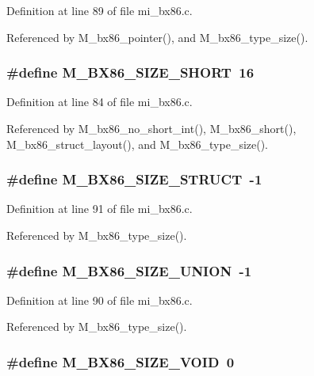 Definition at line 89 of file mi\_\-bx86.c.

Referenced by M\_\-bx86\_\-pointer(), and M\_\-bx86\_\-type\_\-size().
\subsubsection{\setlength{\rightskip}{0pt plus 5cm}\#define M\_\-BX86\_\-SIZE\_\-SHORT~16}\label{mi__bx86_8c_5a85d87ddb76ac09baf70c520844e799}




Definition at line 84 of file mi\_\-bx86.c.

Referenced by M\_\-bx86\_\-no\_\-short\_\-int(), M\_\-bx86\_\-short(), M\_\-bx86\_\-struct\_\-layout(), and M\_\-bx86\_\-type\_\-size().
\subsubsection{\setlength{\rightskip}{0pt plus 5cm}\#define M\_\-BX86\_\-SIZE\_\-STRUCT~-1}\label{mi__bx86_8c_7984e0e0c7edec4f81b3271e48a2de0d}




Definition at line 91 of file mi\_\-bx86.c.

Referenced by M\_\-bx86\_\-type\_\-size().
\subsubsection{\setlength{\rightskip}{0pt plus 5cm}\#define M\_\-BX86\_\-SIZE\_\-UNION~-1}\label{mi__bx86_8c_37e7f213d84f35c8b3fdf1b8ac88e3e6}




Definition at line 90 of file mi\_\-bx86.c.

Referenced by M\_\-bx86\_\-type\_\-size().
\subsubsection{\setlength{\rightskip}{0pt plus 5cm}\#define M\_\-BX86\_\-SIZE\_\-VOID~0}\label{mi__bx86_8c_49fff98fbf23ec5b0b07e9fc3e819dd6}




